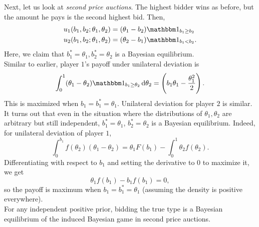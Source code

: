 	\begin{fex}
		Next, let us look at \emph{second price auctions}. The highest bidder wins as before, but the amount he pays is the second highest bid. Then,
		\begin{align*}
			u_1(b_1,b_2;\theta_1,\theta_2) &= (\theta_1 - b_2) \indic_{b_1 \ge b_2} \\
			u_2(b_1,b_2;\theta_1,\theta_2) &= (\theta_2 - b_1) \indic_{b_1 < b_2}.
		\end{align*}
		Here, we claim that $b_1^* = \theta_1, b_2^* = \theta_2$ is a Bayesian equilibrium.\\
		Similar to earlier, player $1$'s payoff under unilateral deviation is
		\[ \int_0^1 (\theta_1 - \theta_2) \indic_{b_1 \ge \theta_2} \dif \theta_2 = \left( b_1\theta_1 - \frac{\theta_1^2}{2} \right).  \]
		This is maximized when $b_1 = b_1^* = \theta_1$. Unilateral deviation for player $2$ is similar. \\

		It turns out that even in the situation where the distributions of $\theta_1,\theta_2$ are arbitrary but still independent, $b_1^* = \theta_1$, $b_2^* = \theta_2$ is a Bayesian equilibrium. Indeed, for unilateral deviation of player $1$,
		\[ \int_{0}^{b_1} f(\theta_2) (\theta_1 - \theta_2) = \theta_1 F\left( b_1 \right) - \int_0^1 \theta_2 f(\theta_2). \]
		Differentiating with respect to $b_1$ and setting the derivative to $0$ to maximize it, we get
		\[ \theta_1 f\left( b_1 \right) - b_1 f\left( b_1 \right) = 0, \]
		so the payoff is maximum when $b_1 = b_1^* = \theta_1$ (assuming the density is positive everywhere).\\
		For any independent positive prior, bidding the true type is a Bayesian equilibrium of the induced Bayesian game in second price auctions.
	\end{fex}